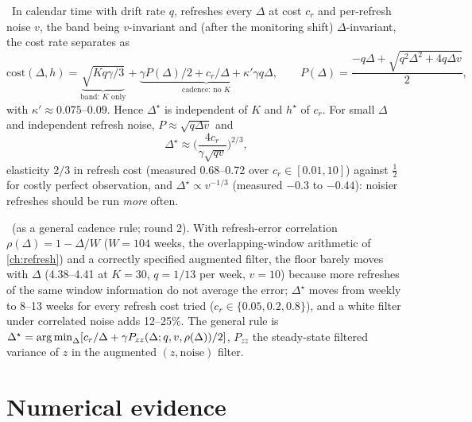 \begin{proposition}
\label{deadband:prop:cadence}
\tagEstablished\ In calendar time with drift rate $q$, refreshes every $\Delta$ at cost $c_r$ and per-refresh noise $v$, the band being $v$-invariant and (after the monitoring shift) $\Delta$-invariant, the cost rate separates as
\begin{equation}
\mathrm{cost}(\Delta, h) = \underbrace{\sqrt{Kq\gamma/3}}_{\text{band: }K\text{ only}} + \underbrace{\gamma P(\Delta)/2 + c_r/\Delta + \kappa'\gamma q\Delta}_{\text{cadence: no }K},
\qquad P(\Delta) = \frac{-q\Delta + \sqrt{q^2\Delta^2 + 4q\Delta v}}{2},
\label{eq:deadband:cadence}
\end{equation}
with $\kappa' \approx 0.075$--$0.09$. Hence $\Delta^\star$ is independent of $K$ and $h^\star$ of $c_r$. For small $\Delta$ and independent refresh noise, $P \approx \sqrt{q\Delta v}$ and
\begin{equation}
\Delta^\star \approx \Big(\frac{4c_r}{\gamma\sqrt{qv}}\Big)^{2/3},
\label{eq:deadband:deltastar}
\end{equation}
elasticity $2/3$ in refresh cost (measured 0.68--0.72 over $c_r \in [0.01, 10]$) against $\tfrac12$ for costly perfect observation, and $\Delta^\star \propto v^{-1/3}$ (measured $-0.3$ to $-0.44$): noisier refreshes should be run \emph{more} often.
\end{proposition}

\begin{proposition}
\label{deadband:prop:corrcadence}
\tagRefuted\ (as a general cadence rule;  round 2). With refresh-error correlation $\rho(\Delta) = 1 - \Delta/W$ ($W = 104$ weeks, the overlapping-window arithmetic of \cref{ch:refresh}) and a correctly specified augmented filter, the floor barely moves with $\Delta$ (4.38--4.41 at $K = 30$, $q = 1/13$ per week, $v = 10$) because more refreshes of the same window information do not average the error; $\Delta^\star$ moves from weekly to 8--13 weeks for every refresh cost tried ($c_r \in \{0.05, 0.2, 0.8\}$), and a white filter under correlated noise adds 12--25\%. The general rule is $\Delta^\star = \operatorname*{arg\,min}_\Delta[c_r/\Delta + \gamma P_{zz}(\Delta; q, v, \rho(\Delta))/2]$, $P_{zz}$ the steady-state filtered variance of $z$ in the augmented $(z, \text{noise})$ filter.
\end{proposition}

\section{Numerical evidence}
\label{deadband:sec:numerics}

